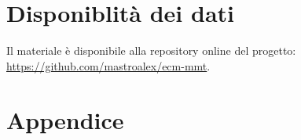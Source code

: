 \textcolor{blue}{\lipsum[1-2]}


\raggedbottom


\raggedbottom
\pagebreak
\section*{Disponiblità dei dati}

Il materiale è disponibile alla repository online del progetto: \url{https://github.com/mastroalex/ecm-mmt}.

\printbibliography[title=Riferimenti]

\clearpage
\onecolumn
\section*{Appendice}

